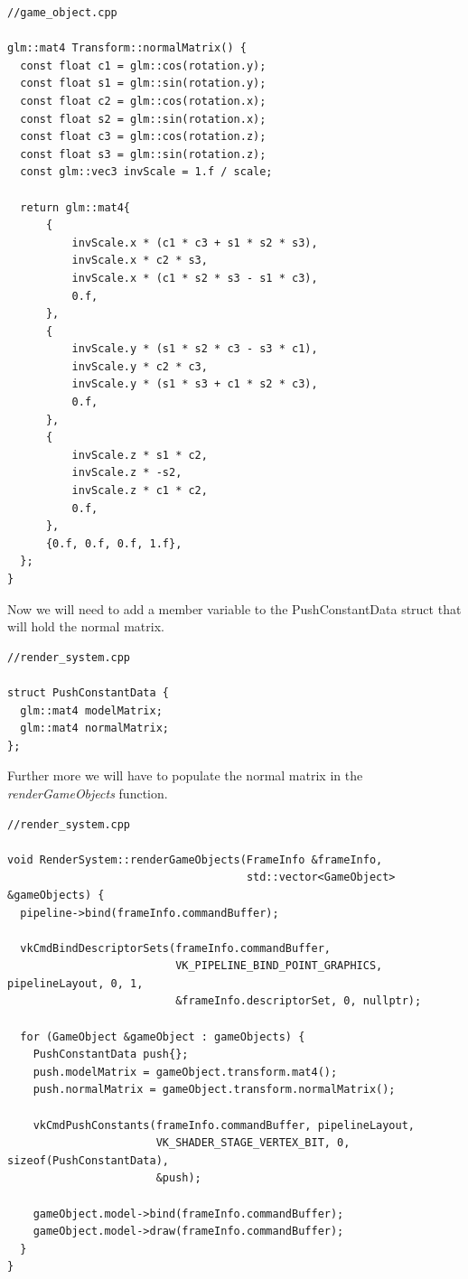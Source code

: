 \documentclass[12pt]{report} \usepackage{preamble}
\begin{document}
\begin{lstlisting}[Language=C++]
//game_object.cpp

glm::mat4 Transform::normalMatrix() {
  const float c1 = glm::cos(rotation.y);
  const float s1 = glm::sin(rotation.y);
  const float c2 = glm::cos(rotation.x);
  const float s2 = glm::sin(rotation.x);
  const float c3 = glm::cos(rotation.z);
  const float s3 = glm::sin(rotation.z);
  const glm::vec3 invScale = 1.f / scale;

  return glm::mat4{
      {
          invScale.x * (c1 * c3 + s1 * s2 * s3),
          invScale.x * c2 * s3,
          invScale.x * (c1 * s2 * s3 - s1 * c3),
          0.f,
      },
      {
          invScale.y * (s1 * s2 * c3 - s3 * c1),
          invScale.y * c2 * c3,
          invScale.y * (s1 * s3 + c1 * s2 * c3),
          0.f,
      },
      {
          invScale.z * s1 * c2,
          invScale.z * -s2,
          invScale.z * c1 * c2,
          0.f,
      },
      {0.f, 0.f, 0.f, 1.f},
  };
}

\end{lstlisting}

Now we will need to add a member variable to the PushConstantData struct that will hold the normal matrix.

\begin{lstlisting}[Language=C++]
//render_system.cpp

struct PushConstantData {
  glm::mat4 modelMatrix;
  glm::mat4 normalMatrix;
};
\end{lstlisting}

Further more we will have to populate the normal matrix in the \textit{renderGameObjects} function.

\begin{lstlisting}[Language=C++]
//render_system.cpp

void RenderSystem::renderGameObjects(FrameInfo &frameInfo,
                                     std::vector<GameObject> &gameObjects) {
  pipeline->bind(frameInfo.commandBuffer);

  vkCmdBindDescriptorSets(frameInfo.commandBuffer,
                          VK_PIPELINE_BIND_POINT_GRAPHICS, pipelineLayout, 0, 1,
                          &frameInfo.descriptorSet, 0, nullptr);

  for (GameObject &gameObject : gameObjects) {
    PushConstantData push{};
    push.modelMatrix = gameObject.transform.mat4();
    push.normalMatrix = gameObject.transform.normalMatrix();

    vkCmdPushConstants(frameInfo.commandBuffer, pipelineLayout,
                       VK_SHADER_STAGE_VERTEX_BIT, 0, sizeof(PushConstantData),
                       &push);

    gameObject.model->bind(frameInfo.commandBuffer);
    gameObject.model->draw(frameInfo.commandBuffer);
  }
}
\end{lstlisting}
\end{document}
